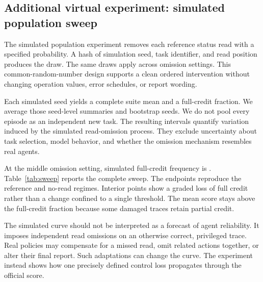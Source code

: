 \documentclass{article}
\begin{document}
\subsection{Additional virtual experiment: simulated population sweep}
The simulated population experiment removes each reference status read with a specified probability. A hash of simulation seed, task identifier, and read position produces the draw. The same draws apply across omission settings. This common-random-number design supports a clean ordered intervention without changing operation values, error schedules, or report wording.\par
Each simulated seed yields a complete suite mean and a full-credit fraction. We average those seed-level summaries and bootstrap seeds. We do not pool every episode as an independent new task. The resulting intervals quantify variation induced by the simulated read-omission process. They exclude uncertainty about task selection, model behavior, and whether the omission mechanism resembles real agents.\par

At the middle omission setting, simulated full-credit frequency is \MidSweep{}. Table~\ref{tab:sweep} reports the complete sweep. The endpoints reproduce the reference and no-read regimes. Interior points show a graded loss of full credit rather than a change confined to a single threshold. The mean score stays above the full-credit fraction because some damaged traces retain partial credit.\par
\begin{table}[ht]\centering\small\caption{Additional simulated population experiment. Intervals bootstrap \NSeeds{} complete seed-level suites at each omission setting. The endpoints are deterministic under this simulated mechanism.}\label{tab:sweep}\end{table}
The simulated curve should not be interpreted as a forecast of agent reliability. It imposes independent read omissions on an otherwise correct, privileged trace. Real policies may compensate for a missed read, omit related actions together, or alter their final report. Such adaptations can change the curve. The experiment instead shows how one precisely defined control loss propagates through the official score.\par
\end{document}
